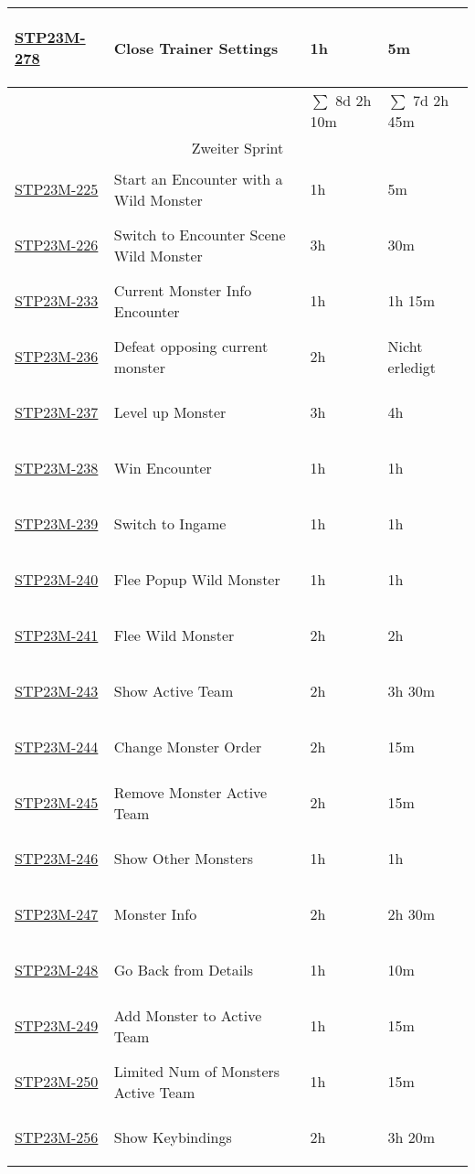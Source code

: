 \begin{longtable}{|l|l|l|l|}
    \hypertarget{T278}{\hyperlink{S278}{STP23M-278}} & Close Trainer Settings & 1h & 5m\\
    \hline
    & & $\sum$ 8d 2h 10m & $\sum$ 7d 2h 45m\\
    \hline
    \multicolumn{4}{|c|}{Zweiter Sprint} \\
    \hline
    \hypertarget{T225}{\hyperlink{S225}{STP23M-225}} & Start an Encounter with a Wild Monster & 1h & 5m\\
    \hypertarget{T226}{\hyperlink{S226}{STP23M-226}} & Switch to Encounter Scene Wild Monster & 3h & 30m\\
    \hypertarget{T233}{\hyperlink{S233}{STP23M-233}} & Current Monster Info Encounter & 1h & 1h 15m\\
    \hypertarget{T236}{\hyperlink{S236}{STP23M-236}} & Defeat opposing current monster & 2h & Nicht erledigt\\
    \hypertarget{T237}{\hyperlink{S237}{STP23M-237}} & Level up Monster & 3h & 4h\\
    \hypertarget{T238}{\hyperlink{S238}{STP23M-238}} & Win Encounter & 1h & 1h\\
    \hypertarget{T239}{\hyperlink{S239}{STP23M-239}} & Switch to Ingame & 1h & 1h\\
    \hypertarget{T240}{\hyperlink{S240}{STP23M-240}} & Flee Popup Wild Monster & 1h & 1h\\
    \hypertarget{T241}{\hyperlink{S241}{STP23M-241}} & Flee Wild Monster & 2h & 2h\\
    \hypertarget{T243}{\hyperlink{S243}{STP23M-243}} & Show Active Team & 2h & 3h 30m\\
    \hypertarget{T244}{\hyperlink{S244}{STP23M-244}} & Change Monster Order & 2h & 15m\\
    \hypertarget{T245}{\hyperlink{S245}{STP23M-245}} & Remove Monster Active Team & 2h & 15m\\
    \hypertarget{T246}{\hyperlink{S246}{STP23M-246}} & Show Other Monsters & 1h & 1h\\
    \hypertarget{T247}{\hyperlink{S247}{STP23M-247}} & Monster Info & 2h & 2h 30m\\
    \hypertarget{T248}{\hyperlink{S248}{STP23M-248}} & Go Back from Details & 1h & 10m\\
    \hypertarget{T249}{\hyperlink{S249}{STP23M-249}} & Add Monster to Active Team & 1h & 15m\\
    \hypertarget{T250}{\hyperlink{S250}{STP23M-250}} & Limited Num of Monsters Active Team & 1h & 15m\\
    \hypertarget{T256}{\hyperlink{S256}{STP23M-256}} & Show Keybindings & 2h & 3h 20m\\

\end{longtable}
